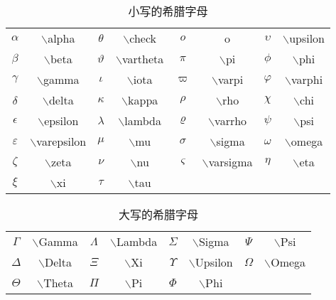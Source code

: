 \documentclass[UTF8]{ctexart}
\begin{document}
\begin{table}[H]
	\caption{小写的希腊字母}
	\centering{}
	
	\begin{tabular}{cccccccc}
		
		$\alpha$ & $\backslash$alpha & $\theta$ & $\backslash$check  &  $o$   & o  & $\upsilon$  &  $\backslash$upsilon   \\
		
		$\beta$  &  $\backslash$beta  &  $\vartheta$  & $\backslash$vartheta  &  $\pi$  & $\backslash$pi  &  $\phi$  &  $\backslash$phi \\
		
		$\gamma$ & $\backslash$gamma &  $\iota$  & $\backslash$iota   &  $\varpi$  & $\backslash$varpi &  $\varphi$  &  $\backslash$varphi\\
		
		$\delta$ & $\backslash$delta & $\kappa$ & $\backslash$kappa  &  $\rho$   & $\backslash$rho  & $\chi$  &  $\backslash$chi   \\

		$\epsilon$  &  $\backslash$epsilon  &  $\lambda$  & $\backslash$lambda  &  $\varrho$  & $\backslash$varrho  &  $\psi$  &  $\backslash$psi \\

		$\varepsilon$ & $\backslash$varepsilon &  $\mu$  & $\backslash$mu   &  $\sigma$  & $\backslash$sigma &  $\omega$  &  $\backslash$omega\\

		$\zeta$ & $\backslash$zeta &  $\nu$  & $\backslash$nu   &  $\varsigma$  & $\backslash$varsigma &  $\eta$  &  $\backslash$eta\\
		
		$\xi$ & $\backslash$xi &  $\tau$  & $\backslash$tau    \\
	\end{tabular}
\end{table}





\begin{table}[H]
	\begin{center}
		\caption{大写的希腊字母}
		\begin{tabular}{cccccccc}
			
		$\Gamma$ & $\backslash$Gamma & $\Lambda$ & $\backslash$Lambda  &  $\Sigma$   & $\backslash$Sigma  & $\Psi$  &  $\backslash$Psi   \\

		$\Delta$  &  $\backslash$Delta  &  $\Xi$  & $\backslash$Xi  &  $\Upsilon$  & $\backslash$Upsilon  &  $\Omega$  &  $\backslash$Omega \\

		$\Theta$ & $\backslash$Theta &  $\Pi$  & $\backslash$Pi   &  $\Phi$  & $\backslash$Phi 

		\end{tabular}
	\end{center}
\end{table}
\end{document}
